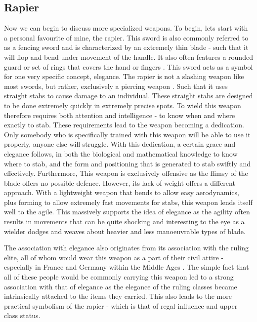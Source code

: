 \documentclass{article}
\begin{document}
\subsection{Rapier} \label{rapierSymbol}
Now we can begin to discuss more specialized weapons. To begin, lets start with a personal favourite of mine, the rapier. This sword is also commonly referred to as a fencing sword and is characterized by an extremely thin blade - such that it will flop and bend under movement of the handle. It also often features a rounded guard or set of rings that covers the hand or fingers \parencite{walker2002rapier12}. This sword acts as a symbol for one very specific concept, elegance. The rapier is not a slashing weapon like most swords, but rather, exclusively a piercing weapon \parencite{walker2002rapierNoCut}. Such that it uses straight stabs to cause damage to an individual. These straight stabs are designed to be done extremely quickly in extremely precise spots. To wield this weapon therefore requires both attention and intelligence - to know when and where exactly to stab. These requirements lead to the weapon becoming a dedication. Only somebody who is specifically trained with this weapon will be able to use it properly, anyone else will struggle. With this dedication, a certain grace and elegance follows, in both the biological and mathematical knowledge \parencite{walker2002rapier25} to know where to stab, and the form and positioning that is generated to stab swiftly and effectively. Furthermore, This weapon is exclusively offensive as the flimsy of the blade offers no possible defence. However, its lack of weight offers a different approach. With a lightweight weapon that bends to allow easy aerodynamics, plus forming to allow extremely fast movements for stabs, this weapon lends itself well to the agile. This massively supports the idea of elegance as the agility often results in movements that can be quite shocking and interesting to the eye as a wielder dodges and weaves about heavier and less manoeuvrable types of blade.

The association with elegance also originates from its association with the ruling elite, all of whom would wear this weapon as a part of their civil attire - especially in France and Germany within the Middle Ages \parencite{correa2013history}. The simple fact that all of these people would be commonly carrying this weapon led to a strong association with that of elegance as the elegance of the ruling classes became intrinsically attached to the items they carried. This also leads to the more practical symbolism of the rapier - which is that of regal influence and upper class status.
\end{document}
